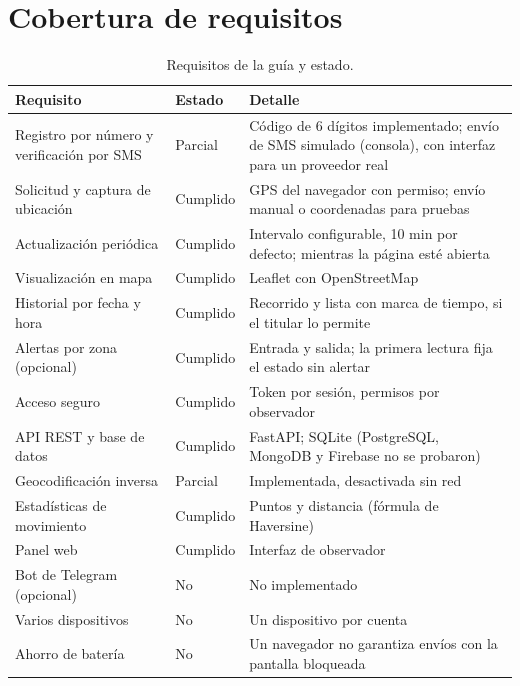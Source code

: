 \section{Cobertura de requisitos}
\begin{table}[H]\centering\small\caption{Requisitos de la guía y estado.}
\begin{tabularx}{\linewidth}{@{}p{4.6cm}p{1.6cm}X@{}}\toprule
\textbf{Requisito} & \textbf{Estado} & \textbf{Detalle}\\\midrule
Registro por número y verificación por SMS & Parcial & Código de 6 dígitos implementado; envío de SMS simulado (consola), con interfaz para un proveedor real\\
Solicitud y captura de ubicación & Cumplido & GPS del navegador con permiso; envío manual o coordenadas para pruebas\\
Actualización periódica & Cumplido & Intervalo configurable, 10 min por defecto; mientras la página esté abierta\\
Visualización en mapa & Cumplido & Leaflet con OpenStreetMap\\
Historial por fecha y hora & Cumplido & Recorrido y lista con marca de tiempo, si el titular lo permite\\
Alertas por zona (opcional) & Cumplido & Entrada y salida; la primera lectura fija el estado sin alertar\\
Acceso seguro & Cumplido & Token por sesión, permisos por observador\\
API REST y base de datos & Cumplido & FastAPI; SQLite (PostgreSQL, MongoDB y Firebase no se probaron)\\
Geocodificación inversa & Parcial & Implementada, desactivada sin red\\
Estadísticas de movimiento & Cumplido & Puntos y distancia (fórmula de Haversine)\\
Panel web & Cumplido & Interfaz de observador\\
Bot de Telegram (opcional) & No & No implementado\\
Varios dispositivos & No & Un dispositivo por cuenta\\
Ahorro de batería & No & Un navegador no garantiza envíos con la pantalla bloqueada\\
\bottomrule\end{tabularx}\end{table}

